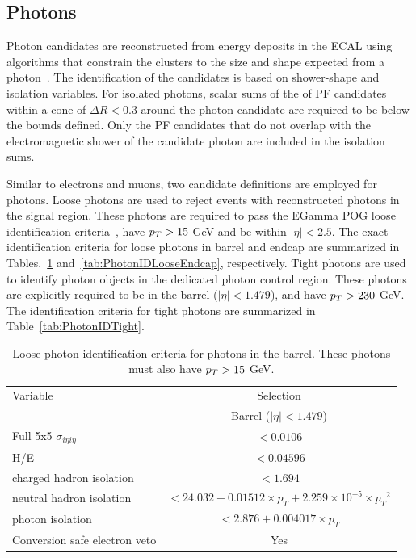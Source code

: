 \subsection{Photons}
\label{subsec:photons}

Photon candidates are reconstructed from energy deposits in the ECAL using algorithms
that constrain the clusters to the size and shape expected from a photon~\cite{CMS:EGM-14-001}.
The identification of the candidates is based on shower-shape and isolation variables.
For isolated photons, scalar sums of the \pt of PF candidates within a cone of $\Delta R < 0.3$
around the photon candidate are required to be below the bounds defined. Only the PF candidates
that do not overlap with the electromagnetic shower of the candidate photon are included in the isolation sums.

Similar to electrons and muons, two candidate definitions are employed for photons. Loose photons are used to reject
events with reconstructed photons in the signal region. These photons are required to pass the EGamma POG loose identification criteria~\cite{CMS-EGM-TWIKI-GAMID},
have $p_T > 15$ GeV and be within $|\eta|<2.5$. The exact identification criteria for loose photons in barrel and endcap 
are summarized in Tables.~\ref{tab:PhotonIDLooseBarrel} and~\ref{tab:PhotonIDLooseEndcap}, respectively.
Tight photons are used to identify photon objects in the dedicated photon control region. 
These photons are explicitly required to be in the barrel ($|\eta|<1.479$), and have $p_T>230$ GeV. The identification criteria for tight photons
are summarized in Table~\ref{tab:PhotonIDTight}.

\begin{table}[htb!]
    \centering
    \small
    \def\arraystretch{1.2}
    \begin{tabular}{l c}
    \hline
    Variable                                   &  Selection       \\
                                               &  Barrel ($|\eta|<1.479$) \\
    \hline
    \hline
    Full 5x5 $\sigma_{i\eta i\eta}$            & $< 0.0106 $    \\
    H/E                                        & $<  0.04596 $    \\
    charged hadron isolation                   & $< 1.694 $     \\
    neutral hadron isolation                   & $< 24.032 + 0.01512\times p_T+2.259\times 10^{-5} \times {p_T}^2$ \\
    photon isolation                           & $< 2.876 + 0.004017\times p_T$  \\
    Conversion safe electron veto              & Yes           \\
    \hline
    \end{tabular}
    \caption{Loose photon identification criteria for photons in the barrel. These photons must also have $p_T > 15$ GeV.}
    \label{tab:PhotonIDLooseBarrel}
\end{table}

